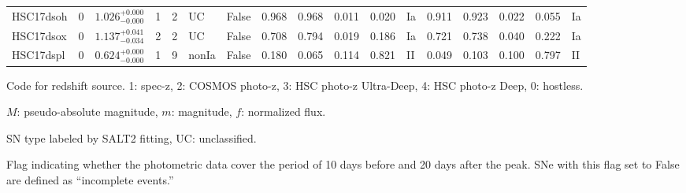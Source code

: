 \documentclass[useamsfonts]{pasj01}
\begin{document}
\begin{table}[htbp]
{\begin{tabular}{p{4.5em}p{1.2em}p{4.0em}p{2.1em}|p{0.6em}p{1.8em}p{3.0em}|p{2.9em}|p{1.2em}p{1.2em}p{1.2em}p{0.6em}|p{2.9em}|p{1.2em}p{1.2em}p{1.2em}p{0.6em}}
HSC17dsoh &     0 &    $1.026_{-0.000}^{+0.000}$ &         1 &    2 &  UC &   False &    0.968 &    0.968 &    0.011 &    0.020 &      Ia &    0.911 &    0.923 &    0.022 &    0.055 &      Ia \\
HSC17dsox &     0 &    $1.137_{-0.034}^{+0.041}$ &         2 &    2 &  UC &   False &    0.708 &    0.794 &    0.019 &    0.186 &      Ia &    0.721 &    0.738 &    0.040 &    0.222 &      Ia \\
HSC17dspl &     0 &    $0.624_{-0.000}^{+0.000}$ &         1 &    9 &  nonIa &   False &    0.180 &    0.065 &    0.114 &    0.821 &      II &    0.049 &    0.103 &    0.100 &    0.797 &      II \\
\hline
\end{tabular}
}\label{tab:h_results}
\begin{tabnote}
\footnotemark[$*$] Code for redshift source.
1: spec-z, 2: COSMOS photo-z, 3: HSC photo-z Ultra-Deep, 4: HSC photo-z Deep, 0: hostless.

\footnotemark[$\dagger$] $M$: pseudo-absolute magnitude, $m$: magnitude, $f$: normalized flux.

\footnotemark[$\ddagger$] SN type labeled by SALT2 fitting, UC: unclassified.

\footnotemark[$\S$] Flag indicating whether the photometric data cover the period of 10 days before and 20 days after the peak. SNe with this flag set to False are defined as ``incomplete events.''
\end{tabnote}
\end{table}
%
%
\end{document}
